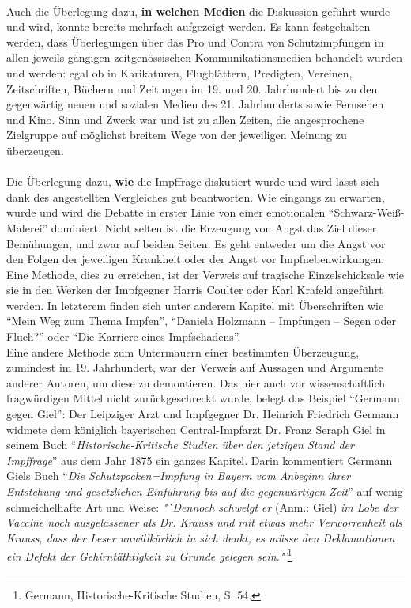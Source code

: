 \documentclass[
    a4paper,
    12pt,
    hyphens,
    chapterprefix=true,
    headheight=33pt,
    footheight=29pt,
    headings=optiontohead, %
]{scrartcl}
\begin{document}
{\\
Auch die Überlegung dazu, \textbf{in welchen Medien} die Diskussion geführt wurde und wird, konnte bereits mehrfach aufgezeigt werden. Es kann festgehalten werden, dass Überlegungen über das Pro und Contra von Schutzimpfungen in allen jeweils gängigen zeitgenössischen Kommunikationsmedien behandelt wurden und werden: egal ob in Karikaturen, Flugblättern, Predigten, Vereinen, Zeitschriften, Büchern und Zeitungen im 19. und 20. Jahrhundert bis zu den gegenwärtig neuen und sozialen Medien des 21. Jahrhunderts sowie Fernsehen und Kino. Sinn und Zweck war und ist zu allen Zeiten, die angesprochene Zielgruppe auf möglichst breitem Wege von der jeweiligen Meinung zu überzeugen.\\
\\
Die Überlegung dazu, \textbf{wie} die Impffrage diskutiert wurde und wird lässt sich dank des angestellten Vergleiches gut beantworten. Wie eingangs zu erwarten, wurde und wird die Debatte in erster Linie von einer emotionalen "`Schwarz-Weiß-Malerei"' dominiert. Nicht selten ist die Erzeugung von Angst das Ziel dieser Bemühungen, und zwar auf beiden Seiten. Es geht entweder um die Angst vor den Folgen der jeweiligen Krankheit oder der Angst vor Impfnebenwirkungen. Eine Methode, dies zu erreichen, ist der Verweis auf tragische Einzelschicksale wie sie in den Werken der Impfgegner Harris Coulter oder Karl Krafeld angeführt werden. In letzterem finden sich unter anderem Kapitel mit Überschriften wie "`Mein Weg zum Thema Impfen"', "`Daniela Holzmann -- Impfungen -- Segen oder Fluch?"' oder "`Die Karriere eines Impfschadens"'. \\
Eine andere Methode zum Untermauern einer bestimmten Überzeugung, zumindest im 19. Jahrhundert, war der Verweis auf Aussagen und Argumente anderer Autoren, um diese zu demontieren. Das hier auch vor wissenschaftlich fragwürdigen Mittel nicht zurückgeschreckt wurde, belegt das Beispiel "`Germann gegen Giel"': Der Leipziger Arzt und Impfgegner Dr. Heinrich Friedrich Germann widmete dem königlich bayerischen Central-Impfarzt Dr. Franz Seraph Giel in seinem Buch "`\textit{Historische-Kritische Studien über den jetzigen Stand der Impffrage}"' aus dem Jahr 1875 ein ganzes Kapitel. Darin kommentiert Germann Giels Buch "`\textit{Die Schutzpocken=Impfung in Bayern vom Anbeginn ihrer Entstehung und gesetzlichen Einführung bis auf die gegenwärtigen Zeit}"' auf wenig schmeichelhafte Art und Weise: \textit{"`Dennoch schwelgt er} (Anm.: Giel) \textit{im Lobe der Vaccine noch ausgelassener als Dr. Krauss und mit etwas mehr Verworrenheit als Krauss, dass der Leser unwillkürlich in sich denkt, es müsse den Deklamationen ein Defekt der Gehirntäthtigkeit zu Grunde gelegen sein."'}\footnote{Germann, Historische-Kritische Studien, S. 54.}\\
}
\end{document}

